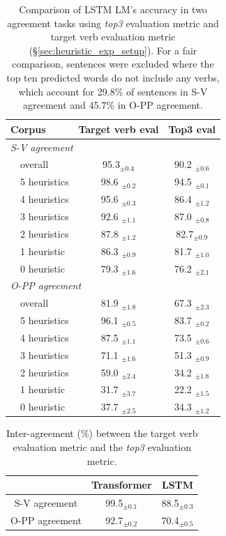 \begin{table}[ht]
  \centering
  \begin{tabular}{llcc}
    \toprule
    \multicolumn{2}{l}{Corpus}  & Target verb eval & Top3 eval \\
    \midrule
    \multicolumn{4}{l}{\textit{S-V agreement}} \\
    \phantom{ab} & overall  & 95.3$_{\pm 0.4}$   & 90.2 $_{\pm 0.6}$ \\\cline{2-4}
    \phantom{ab} & 5 heuristics  &98.6 $_{\pm 0.2}$ & 94.5 $_{\pm 0.1}$ \\
    \phantom{ab} & 4 heuristics  &95.6 $_{\pm 0.3}$ & 86.4 $_{\pm 1.2}$ \\
    \phantom{ab} & 3 heuristics  & 92.6 $_{\pm 1.1}$ & 87.0 $_{\pm 0.8}$\\
    \phantom{ab} & 2 heuristics  & 87.8 $_{\pm 1.2}$& 82.7$_{\pm 0.9}$\\    
    \phantom{ab} & 1 heuristic &86.3 $_{\pm 0.9}$& 81.7 $_{\pm 1.0}$\\
    \phantom{ab} & 0 heuristic &79.3 $_{\pm 1.6}$ & 76.2 $_{\pm 2.1}$\\
    \midrule
    \multicolumn{4}{l}{\textit{O-PP agreement}} \\
     & overall  & 81.9 $_{\pm 1.8}$  & 67.3 $_{\pm 2.3}$     \\\cline{2-4}
      & 5 heuristics  &96.1 $_{\pm 0.5}$ & 83.7 $_{\pm 0.2}$ \\
     & 4 heuristics  &87.5 $_{\pm 1.1}$ & 73.5 $_{\pm 0.6}$\\
     & 3 heuristics  & 71.1 $_{\pm 1.6}$& 51.3 $_{\pm 0.9}$\\
     & 2 heuristics  & 59.0 $_{\pm 2.4}$& 34.2 $_{\pm 1.8}$\\    
     & 1 heuristic &31.7 $_{\pm 3.7}$& 22.2  $_{\pm 1.5}$ \\
     & 0 heuristic  &37.7 $_{\pm 2.5}$& 34.3 $_{\pm 1.2}$\\
    \bottomrule
  \end{tabular}
\caption{Comparison of LSTM LM's accuracy in two agreement tasks using \textit{top3} evaluation metric and target verb evaluation metric (\S\ref{sec:heuristic_exp_setup}). For a fair comparison, sentences were excluded where the top ten predicted words do not include any verbs, which account for 29.8\% of sentences in S-V agreement and 45.7\% in O-PP agreement. \label{tab:lstm_full_2_eval}
}
\end{table}

\begin{table}[ht]
    \centering
    \begin{tabular}{ccc}
        \toprule
         & Transformer& LSTM\\
         \midrule
         S-V agreement& 99.5$_{\pm 0.1}$ & 88.5$_{\pm 0.3}$\\
        O-PP agreement &92.7$_{\pm 0.2}$& 70.4$_{\pm 0.5}$ \\
        \bottomrule
    \end{tabular}
    \caption{Inter-agreement (\%) between the target verb evaluation metric and the \textit{top3} evaluation metric.}
    \label{tab:inter_agreement}
\end{table}


